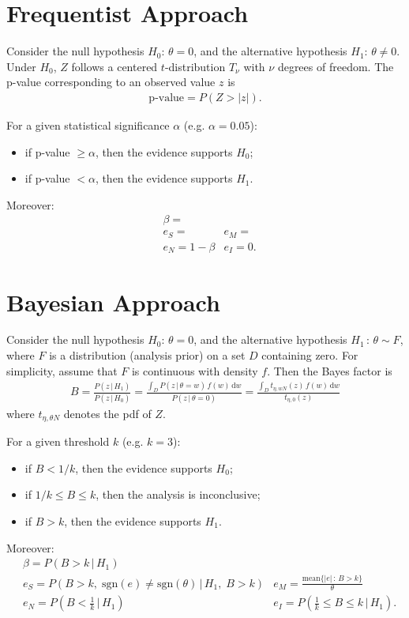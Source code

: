 \documentclass[11pt,a4paper,openright,twoside]{article}
\begin{document}
\vspace{15mm}



\section{Frequentist Approach}
Consider the null hypothesis $H_0:\,\theta=0$, and the alternative hypothesis $H_1:\,\theta\neq 0$. Under $H_0$, $Z$ follows a centered $t$-distribution $T_{\nu}$ with $\nu$ degrees of freedom. The p-value corresponding to an observed value $z$ is
\begin{align*}
\text{p-value}=P(Z>|z|).
\end{align*}

For a given statistical significance $\alpha$ (e.g. $\alpha=0.05$):
\begin{itemize}
\item if p-value $\geq \alpha$, then the evidence supports $H_0$;
\item if  p-value $< \alpha$, then the evidence supports $H_1$.
\end{itemize}

Moreover:
\begin{align*}
& \beta= \\
& e_S= & e_M=\\
& e_N=1-\beta & e_I=0.
\end{align*}



\vspace{15mm}


\section{Bayesian Approach}
Consider the null hypothesis $H_0:\,\theta=0$, and the alternative hypothesis $H_1\,:\, \theta\sim F$, where $F$ is a distribution (analysis prior) on a set $D$ containing zero. For simplicity, assume that $F$ is continuous with density $f$. Then the Bayes factor is
\begin{align*}
B = \frac{P(z\,|\,H_1)}{P(z\,|\,H_0)}=\frac{\int_D P(z\,|\,\theta=w)\,f(w)\,\text{d}w}{P(z\,|\,\theta=0)}=\frac{\int_D t_{\eta,wN}(z)\,f(w)\,\text{d}w}{t_{\eta,0}(z)}
\end{align*}
where $t_{\eta,\theta N}$ denotes the pdf of $Z$.

For a given threshold $k$ (e.g. $k=3$):
\begin{itemize}
\item if $B < 1/k$, then the evidence supports $H_0$;
\item if $1/k \leq B \leq k$, then the analysis is inconclusive;
\item if $B > k$, then the evidence supports $H_1$.
\end{itemize}

Moreover:
\begin{align*}
& \beta=P(B>k\,|\,H_1) \\
& e_S=P(B>k,\; \text{sgn}(e)\neq\text{sgn}(\theta)\,|\,H_1,\;B>k) & e_M=\frac{\text{mean}\{|e|\,:\,B>k\}}{\theta}\\
& e_N=P\left(B< \frac{1}{k}\,|\,H_1\right) & e_I=P\left(\frac{1}{k} \leq B \leq k\,|\,H_1\right).
\end{align*}
\end{document}
